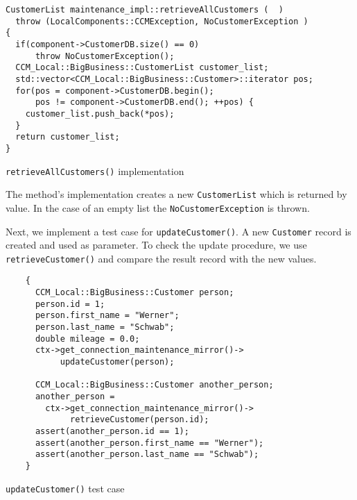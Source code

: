 \begin{Example}
\begin{minifbox}
\begin{small}
\begin{verbatim}
CustomerList maintenance_impl::retrieveAllCustomers (  )
  throw (LocalComponents::CCMException, NoCustomerException )
{
  if(component->CustomerDB.size() == 0)
      throw NoCustomerException();
  CCM_Local::BigBusiness::CustomerList customer_list;
  std::vector<CCM_Local::BigBusiness::Customer>::iterator pos;
  for(pos = component->CustomerDB.begin(); 
      pos != component->CustomerDB.end(); ++pos) {
    customer_list.push_back(*pos);
  }
  return customer_list;
}
\end{verbatim}
\end{small}
\end{minifbox}
\caption{{\tt retrieveAllCustomers()} implementation }
\label{example:retrieveAllCustomersImpl}
\end{Example}

The method's implementation creates a new {\tt CustomerList} which
is returned by value.
In the case of an empty list the {\tt NoCustomerException} is thrown.


Next, we implement a test case for {\tt updateCustomer()}.
A new {\tt Customer} record is created and used as parameter.
To check the update procedure, we use {\tt retrieveCustomer()} 
and compare the result record with the new values.
\begin{Example}
\begin{minifbox}
\begin{small}
\begin{verbatim}
    {
      CCM_Local::BigBusiness::Customer person;
      person.id = 1;
      person.first_name = "Werner";
      person.last_name = "Schwab";
      double mileage = 0.0;
      ctx->get_connection_maintenance_mirror()->
           updateCustomer(person);      

      CCM_Local::BigBusiness::Customer another_person;
      another_person = 
        ctx->get_connection_maintenance_mirror()->
             retrieveCustomer(person.id);
      assert(another_person.id == 1);
      assert(another_person.first_name == "Werner");
      assert(another_person.last_name == "Schwab");
    }
\end{verbatim}
\end{small}
\end{minifbox}
\caption{{\tt updateCustomer()} test case}
\label{example:}
\end{Example}



